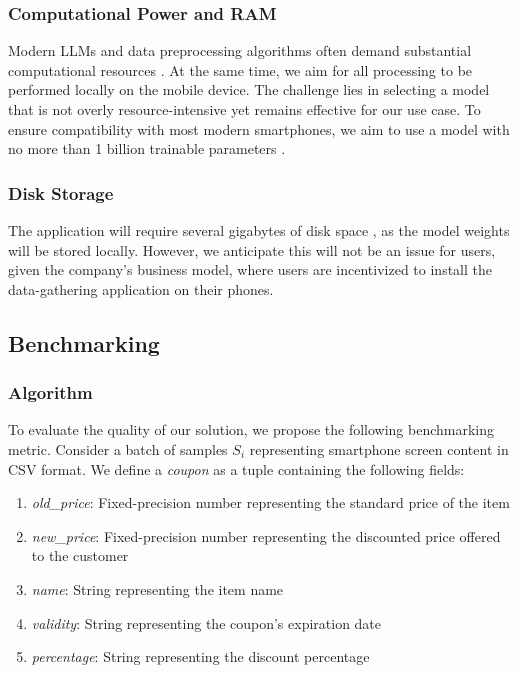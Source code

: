 \documentclass[12pt]{article}
\begin{document}
\subsubsection*{Computational Power and RAM}
Modern LLMs and data preprocessing algorithms often demand substantial computational resources \cite{LLMmobile2024}. At the same time, we aim for all processing to be performed locally on the mobile device. The challenge lies in selecting a model that is not overly resource-intensive yet remains effective for our use case. To ensure compatibility with most modern smartphones, we aim to use a model with no more than 1 billion trainable parameters \cite{li2025palmbenchcomprehensivebenchmarkcompressed}.

\subsubsection*{Disk Storage}
The application will require several gigabytes of disk space \cite{llama32-1b-size}, as the model weights will be stored locally. However, we anticipate this will not be an issue for users, given the company's business model, where users are incentivized to install the data-gathering application on their phones.


\subsection*{Benchmarking}

\subsubsection*{Algorithm}
To evaluate the quality of our solution, we propose the following benchmarking metric. Consider a batch of samples \( S_i \) representing smartphone screen content in CSV format. We define a \textit{coupon} as a tuple containing the following fields:

\begin{enumerate}
    \item \textit{old\_price}: Fixed-precision number representing the standard price of the item
    \item \textit{new\_price}: Fixed-precision number representing the discounted price offered to the customer
    \item \textit{name}: String representing the item name
    \item \textit{validity}: String representing the coupon's expiration date
    \item \textit{percentage}: String representing the discount percentage
\end{enumerate}
\end{document}
